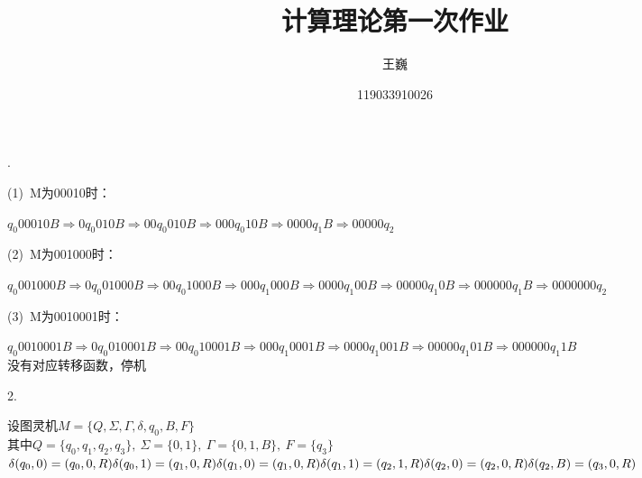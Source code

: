 \documentclass[a4paper,12pt,oneside,final,titlepage]{article}
\author{王巍}
\title{计算理论第一次作业}
\date{119033910026}
\begin{document}
\maketitle
{}.
\begin{adjustwidth}{2em}{}
(1)\ M为00010时：
\begin{adjustwidth}{2em}{}
$q_{0}00010B\Rightarrow 0q_{0}010B\Rightarrow 00q_{0}010B\Rightarrow 000q_{0}10B\Rightarrow 0000q_{1}B\Rightarrow 00000q_{2}$
\end{adjustwidth}
(2)\ M为001000时：
\begin{adjustwidth}{2em}{}
$q_{0}001000B\Rightarrow 0q_{0}01000B\Rightarrow 00q_{0}1000B\Rightarrow 000q_{1}000B\Rightarrow 0000q_{1}00B\Rightarrow 00000q_{1}0B\Rightarrow 000000q_{1}B\Rightarrow 0000000q_{2}$
\end{adjustwidth}
(3)\ M为0010001时：
\begin{adjustwidth}{2em}{}
$q_{0}0010001B\Rightarrow 0q_{0}010001B\Rightarrow 00q_{0}10001B\Rightarrow 000q_{1}0001B\Rightarrow 0000q_{1}001B\Rightarrow 00000q_{1}01B\Rightarrow 000000q_{1}1B$ \\
没有对应转移函数，停机
\end{adjustwidth}
\end{adjustwidth}
2.
\begin{adjustwidth}{2em}{}
设图灵机$M = \{ Q, \Sigma, \Gamma, \delta, q_0, B, F \}$ \\
其中$Q = \{q_0, q_1, q_2 ,q_3\}, \ \Sigma = \{0, 1\},\ \Gamma = \{0, 1, B\},\ F = \{q_3\}$ \\
$\delta(q_0, 0) = (q_0, 0, R)\\ 
\delta(q_0, 1) = (q_1, 0, R)\\
\delta(q_1, 0) = (q_1, 0, R)\\
\delta(q_1, 1) = (q_2, 1, R)\\
\delta(q_2, 0) = (q_2, 0, R)\\
\delta(q_2, B) = (q_3, 0, R)$
\end{adjustwidth}
\begin{adjustwidth}{2em}{}
\end{adjustwidth}
\end{document}

